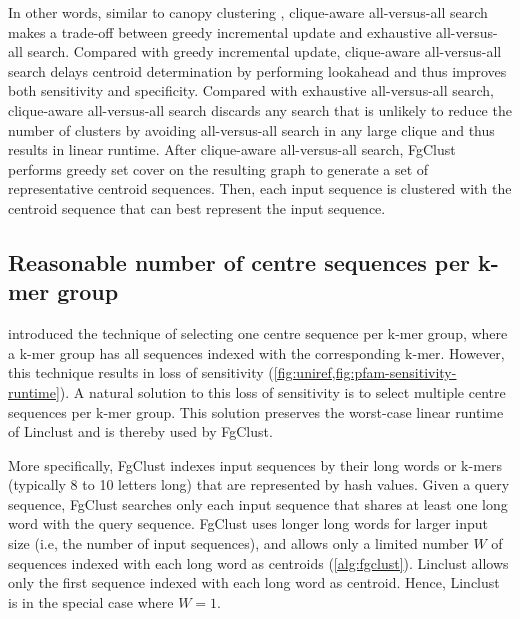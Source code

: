 \documentclass{bioinfo}
\begin{document}
\begin{methods}
In other words, similar to canopy clustering \citep{mccallum2000efficient}, clique-aware all-versus-all search makes a trade-off between greedy incremental update and exhaustive all-versus-all search. 
Compared with greedy incremental update, clique-aware all-versus-all search delays centroid determination by performing lookahead and thus improves both sensitivity and specificity.
Compared with exhaustive all-versus-all search, clique-aware all-versus-all search discards any search that is unlikely to reduce the number of clusters by avoiding all-versus-all search in any large clique and thus results in linear runtime.
After clique-aware all-versus-all search, FgClust performs greedy set cover on the resulting graph to generate a set of representative centroid sequences.
Then, each input sequence is clustered with the centroid sequence that can best represent the input sequence.


\subsection{Reasonable number of centre sequences per k-mer group}
\label{subsec:linclust-like}

 introduced the technique of selecting one centre sequence per k-mer group, where a k-mer group has all sequences indexed with the corresponding k-mer. However, this technique results in loss of sensitivity (\cref{fig:uniref,fig:pfam-sensitivity-runtime}). A natural solution to this loss of sensitivity is to select multiple centre sequences per k-mer group. This solution preserves the worst-case linear runtime of Linclust and is thereby used by FgClust.

More specifically, FgClust indexes input sequences by their long words or k-mers (typically 8 to 10 letters long) that are represented by hash values.
%
Given a query sequence, FgClust searches only each input sequence that shares at least one long word with the query sequence. 
FgClust uses longer long words for larger input size (i.e, the number of input sequences), and allows only a limited number \(W\) of sequences indexed with each long word as centroids (\cref{alg:fgclust}).
Linclust allows only the first sequence indexed with each long word as centroid.
Hence, Linclust is in the special case where \(W=1\).


\end{methods}
\end{document}
